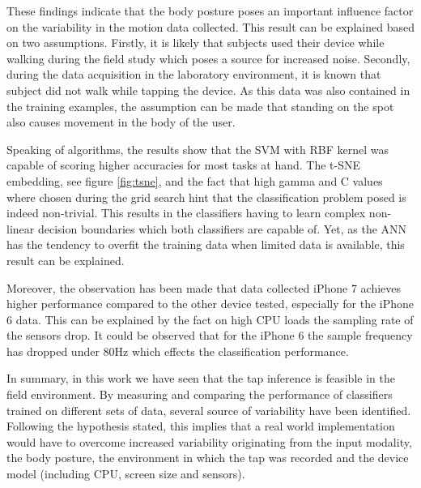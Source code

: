 These findings indicate that the body posture poses an important influence factor on the variability in the motion data collected. This result can be explained based on two assumptions. Firstly, it is likely that subjects used their device while walking during the field study which poses a source for increased noise. Secondly, during the data acquisition in the laboratory environment, it is known that subject did not walk while tapping the device. As this data was also contained in the training examples, the assumption can be made that standing on the spot also causes movement in the body of the user.

Speaking of algorithms, the results show that the SVM with RBF kernel was capable of scoring higher accuracies for most tasks at hand. The t-SNE embedding, see figure \ref{fig:tsne}, and the fact that high gamma and C values where chosen during the grid search hint that the classification problem posed is indeed non-trivial. This results in the classifiers having to learn complex non-linear decision boundaries which both classifiers are capable of. Yet, as the ANN has the tendency to overfit the training data when limited data is available, this result can be explained.

Moreover, the observation has been made that data collected iPhone 7 achieves higher performance compared to the other device tested, especially for the iPhone 6 data. This can be explained by the fact on high CPU loads the sampling rate of the sensors drop. It could be observed that for the iPhone 6 the sample frequency has dropped under 80Hz which effects the classification performance.

In summary, in this work we have seen that the tap inference is feasible in the field environment. By measuring and comparing the performance of classifiers trained on different sets of data, several source of variability have been identified. Following the hypothesis stated, this implies that a real world implementation would have to overcome increased variability originating from the input modality, the body posture, the environment in which the tap was recorded and the device model (including CPU, screen size and sensors). 

